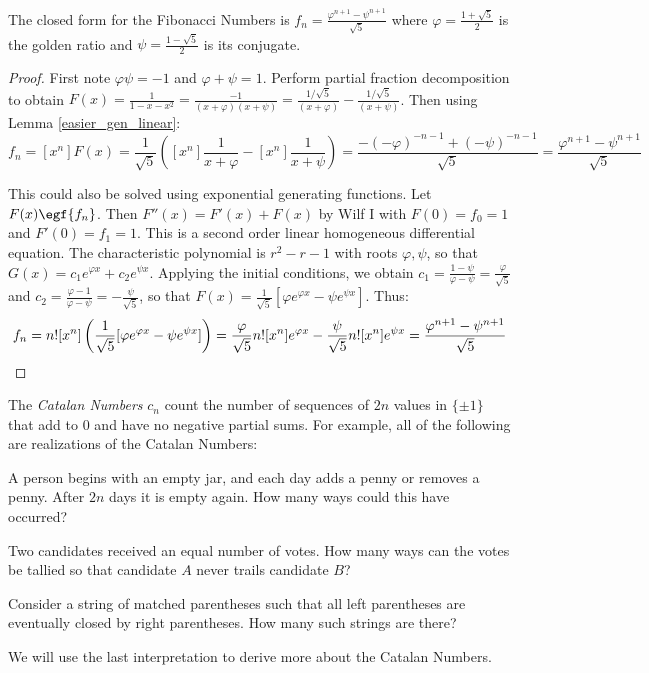 \documentclass[a4paper]{article}
\begin{document}
\begin{lemma}
The closed form for the Fibonacci Numbers is $\displaystyle f_n=\frac{\varphi^{n+1}-\psi^{n+1}}{\sqrt5}$ where $\varphi=\frac{1+\sqrt5}2$ is the golden ratio and $\psi=\frac{1-\sqrt5}2$ is its conjugate.

\begin{hl}
\begin{proof}
First note $\varphi\psi=-1$ and $\varphi+\psi=1$. Perform partial fraction decomposition to obtain $F(x)=\frac1{1-x-x^2}=\frac{-1}{(x+\varphi)(x+\psi)}=\frac{1/\sqrt5}{(x+\varphi)}-\frac{1/\sqrt5}{(x+\psi)}$. Then using Lemma \ref{easier_gen_linear}:
\begin{equation*}
f_n
=[x^n]F(x)
=\frac1{\sqrt5}\left([x^n]\frac{1}{x+\varphi}-[x^n]\frac{1}{x+\psi}\right)
=\frac{-(-\varphi)^{-n-1}+(-\psi)^{-n-1}}{\sqrt5}
=\frac{\varphi^{n+1}-\psi^{n+1}}{\sqrt5}
\end{equation*}

This could also be solved using exponential generating functions. Let $F(x)\egf\{f_n\}$. Then $F''(x)=F'(x)+F(x)$ by Wilf I with $F(0)=f_0=1$ and $F'(0)=f_1=1$. This is a second order linear homogeneous differential equation. The characteristic polynomial is $r^2-r-1$ with roots $\varphi,\psi$, so that $G(x)=c_1e^{\varphi x}+c_2e^{\psi x}$. Applying the initial conditions, we obtain $c_1=\frac{1-\psi}{\varphi-\psi}=\frac{\varphi}{\sqrt 5}$ and $c_2=\frac{\varphi-1}{\varphi-\psi}=-\frac{\psi}{\sqrt5}$, so that $F(x)=\frac1{\sqrt5}[\varphi e^{\varphi x}-\psi e^{\psi x}]$. Thus:
\begin{equation*}
f_n
=n![x^n]\left(\frac1{\sqrt5}[\varphi e^{\varphi x}-\psi e^{\psi x}]\right)
=\frac{\varphi}{\sqrt5} n![x^n]e^{\varphi x}-\frac{\psi}{\sqrt5} n![x^n]e^{\psi x}
=\frac{\varphi^{n+1}-\psi^{n+1}}{\sqrt5}\qedhere
\end{equation*}
\end{proof}
\end{hl}
\end{lemma}

\begin{definition}
The \emph{Catalan Numbers} $c_n$ count the number of sequences of $2n$ values in $\{\pm1\}$ that add to $0$ and have no negative partial sums. For example, all of the following are realizations of the Catalan Numbers:
\begin{arrows}
\item A person begins with an empty jar, and each day adds a penny or removes a penny. After $2n$ days it is empty again. How many ways could this have occurred?
\item Two candidates received an equal number of votes. How many ways can the votes be tallied so that candidate $A$ never trails candidate $B$?
\item Consider a string of matched parentheses such that all left parentheses are eventually closed by right parentheses. How many such strings are there?
\end{arrows}
We will use the last interpretation to derive more about the Catalan Numbers.
\end{definition}
\end{document}
